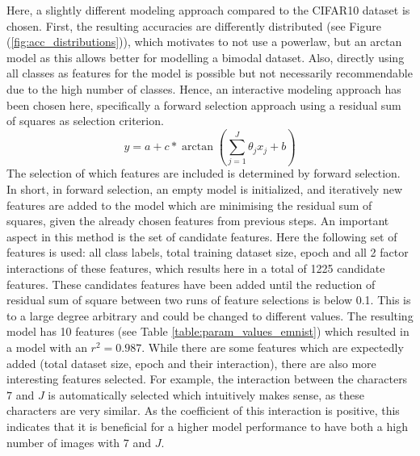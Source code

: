 \documentclass{article} %
\begin{document}
Here, a slightly different modeling approach compared to the CIFAR10 dataset is chosen. 
First, the resulting accuracies are differently distributed (see Figure (\ref{fig:acc_distributions})), which motivates to not use a powerlaw, but an arctan model as this allows better for modelling a bimodal dataset.
Also, directly using all classes as features for the model is possible but not necessarily recommendable due to the high number of classes.
Hence, an interactive modeling approach has been chosen here, specifically a forward selection approach using a residual sum of squares as selection criterion. 
$$y = a + c* \arctan{\left(\sum_{j = 1}^{J}{\theta_j x_j} + b \right)}$$
The selection of which features are included is determined by forward selection. In short, in forward selection, an empty model is initialized, and iteratively new features are added to the model which are minimising the residual sum of squares, given the already chosen features from previous steps.
An important aspect in this method is the set of candidate features. Here the following set of features is used: all class labels, total training dataset size, epoch and all 2 factor interactions of these features, which results here in a total of 1225 candidate features.
These candidates features have been added until the reduction of residual sum of square between two runs of feature selections is below 0.1.
This is to a large degree arbitrary and could be changed to different values.  
The resulting model has 10 features (see Table \ref{table:param_values_emnist}) which resulted in a model with an $r^2 = 0.987$. While there are some features which are expectedly added (total dataset size, epoch and their interaction), there are also more interesting features selected.
For example, the interaction between the characters $7$ and $J$ is automatically selected which intuitively makes sense, as these characters are very similar. As the coefficient of this interaction is positive, this indicates that it is beneficial for a higher model performance to have both a high number of images with $7$ and $J$.
\end{document}

